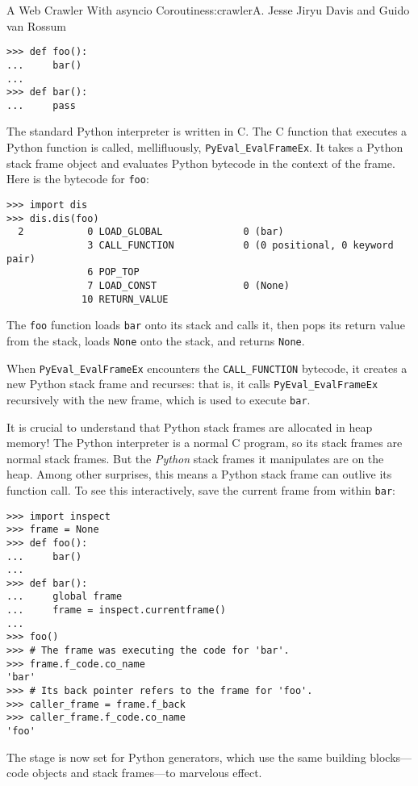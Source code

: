 \begin{aosachapter}{A Web Crawler With asyncio Coroutines}{s:crawler}{A. Jesse Jiryu Davis and Guido van Rossum}
\begin{verbatim}
>>> def foo():
...     bar()
...
>>> def bar():
...     pass
\end{verbatim}

The standard Python interpreter is written in C. The C function that
executes a Python function is called, mellifluously,
\texttt{PyEval\_EvalFrameEx}. It takes a Python stack frame object and
evaluates Python bytecode in the context of the frame. Here is the
bytecode for \texttt{foo}:

\begin{verbatim}
>>> import dis
>>> dis.dis(foo)
  2           0 LOAD_GLOBAL              0 (bar)
              3 CALL_FUNCTION            0 (0 positional, 0 keyword pair)
              6 POP_TOP
              7 LOAD_CONST               0 (None)
             10 RETURN_VALUE
\end{verbatim}

The \texttt{foo} function loads \texttt{bar} onto its stack and calls
it, then pops its return value from the stack, loads \texttt{None} onto
the stack, and returns \texttt{None}.

When \texttt{PyEval\_EvalFrameEx} encounters the \texttt{CALL\_FUNCTION}
bytecode, it creates a new Python stack frame and recurses: that is, it
calls \texttt{PyEval\_EvalFrameEx} recursively with the new frame, which
is used to execute \texttt{bar}.


It is crucial to understand that Python stack frames are allocated in
heap memory! The Python interpreter is a normal C program, so its stack
frames are normal stack frames. But the \emph{Python} stack frames it
manipulates are on the heap. Among other surprises, this means a Python
stack frame can outlive its function call. To see this interactively,
save the current frame from within \texttt{bar}:

\begin{verbatim}
>>> import inspect
>>> frame = None
>>> def foo():
...     bar()
...
>>> def bar():
...     global frame
...     frame = inspect.currentframe()
...
>>> foo()
>>> # The frame was executing the code for 'bar'.
>>> frame.f_code.co_name
'bar'
>>> # Its back pointer refers to the frame for 'foo'.
>>> caller_frame = frame.f_back
>>> caller_frame.f_code.co_name
'foo'
\end{verbatim}

The stage is now set for Python generators, which use the same building
blocks---code objects and stack frames---to marvelous effect.


\end{aosachapter}
